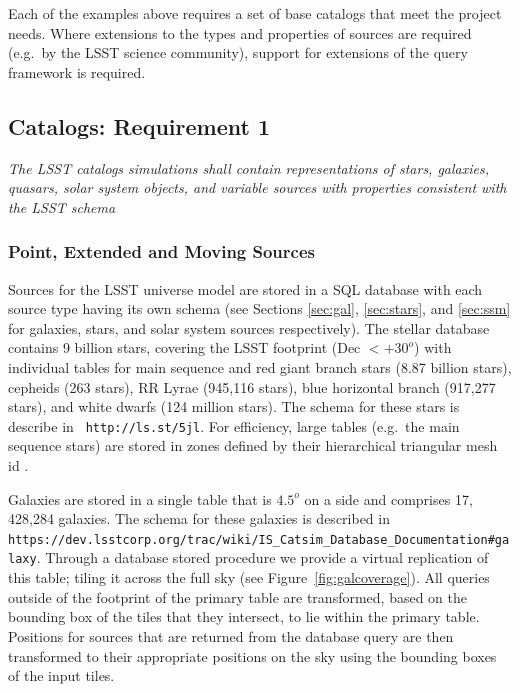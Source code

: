 \documentclass[]{article}
\begin{document}
Each of the examples above requires a set of base catalogs that meet
the project needs.  Where extensions to the types and properties of
sources are required (e.g.\ by the LSST science community), support for
extensions of the query framework is required.

\subsection{Catalogs: Requirement 1}

{\it The LSST catalogs simulations shall contain representations of
  stars, galaxies, quasars, solar system objects, and variable sources
  with properties consistent with the LSST schema}\\

\subsubsection{Point, Extended and Moving Sources}

Sources for the LSST universe model are stored in a SQL database with
each source type having its own schema (see Sections \ref{sec:gal},
\ref{sec:stars}, and \ref{sec:ssm} for galaxies, stars, and solar
system sources respectively). The stellar database contains 9 billion
stars, covering the LSST footprint (Dec $< +30^o$) with individual
tables for main sequence and red giant branch stars (8.87 billion
stars), cepheids (263 stars), RR Lyrae (945,116 stars), blue
horizontal branch (917,277 stars), and white dwarfs (124 million
stars).  The schema for these stars is describe in {\tt
  http://ls.st/5jl}. For efficiency, large tables (e.g.\ the main
sequence stars) are stored in zones defined by their hierarchical
triangular mesh id \citep[HTM][]{htm}.

Galaxies are stored in a single table that is $4.5^o$ on a side and
comprises 17, 428,284 galaxies. The schema for these galaxies is
described in {\tt
  https://dev.lsstcorp.org/trac/wiki/IS\_Catsim\_Database\_Documentation\#galaxy}.
Through a database stored procedure we provide a virtual replication
of this table; tiling it across the full sky (see
Figure~\ref{fig:galcoverage}). All queries outside of the footprint of
the primary table are transformed, based on the bounding box of the
tiles that they intersect, to lie within the primary table. Positions
for sources that are returned from the database query are then
transformed to their appropriate positions on the sky using the
bounding boxes of the input tiles.
\end{document}

